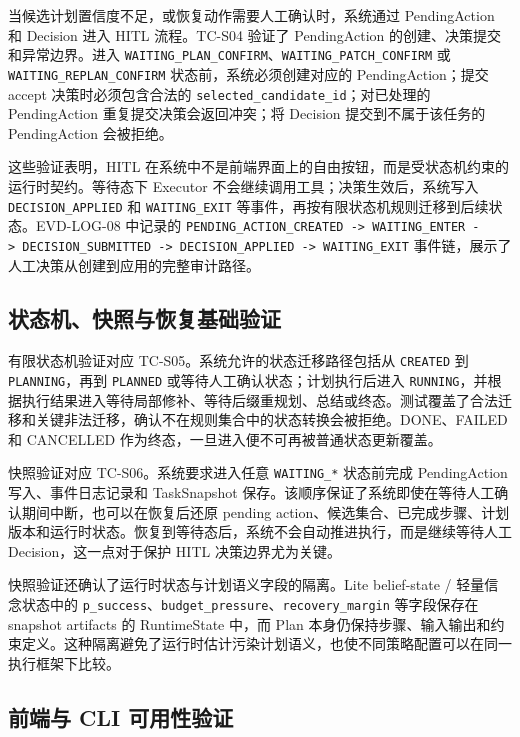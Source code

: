 当候选计划置信度不足，或恢复动作需要人工确认时，系统通过 PendingAction
和 Decision 进入 HITL 流程。TC-S04 验证了 PendingAction
的创建、决策提交和异常边界。进入
\texttt{WAITING\_PLAN\_CONFIRM}、\texttt{WAITING\_PATCH\_CONFIRM} 或
\texttt{WAITING\_REPLAN\_CONFIRM} 状态前，系统必须创建对应的
PendingAction；提交 accept 决策时必须包含合法的
\texttt{selected\_candidate\_id}；对已处理的 PendingAction
重复提交决策会返回冲突；将 Decision 提交到不属于该任务的 PendingAction
会被拒绝。

这些验证表明，HITL
在系统中不是前端界面上的自由按钮，而是受状态机约束的运行时契约。等待态下
Executor 不会继续调用工具；决策生效后，系统写入
\texttt{DECISION\_APPLIED} 和 \texttt{WAITING\_EXIT}
等事件，再按有限状态机规则迁移到后续状态。EVD-LOG-08 中记录的
\texttt{PENDING\_ACTION\_CREATED\ -\textgreater{}\ WAITING\_ENTER\ -\textgreater{}\ DECISION\_SUBMITTED\ -\textgreater{}\ DECISION\_APPLIED\ -\textgreater{}\ WAITING\_EXIT}
事件链，展示了人工决策从创建到应用的完整审计路径。

\subsection{状态机、快照与恢复基础验证}\label{ux72b6ux6001ux673aux5febux7167ux4e0eux6062ux590dux57faux7840ux9a8cux8bc1}

有限状态机验证对应 TC-S05。系统允许的状态迁移路径包括从 \texttt{CREATED}
到 \texttt{PLANNING}，再到 \texttt{PLANNED}
或等待人工确认状态；计划执行后进入
\texttt{RUNNING}，并根据执行结果进入等待局部修补、等待后缀重规划、总结或终态。测试覆盖了合法迁移和关键非法迁移，确认不在规则集合中的状态转换会被拒绝。DONE、FAILED
和 CANCELLED 作为终态，一旦进入便不可再被普通状态更新覆盖。

快照验证对应 TC-S06。系统要求进入任意 \texttt{WAITING\_*} 状态前完成
PendingAction 写入、事件日志记录和 TaskSnapshot
保存。该顺序保证了系统即使在等待人工确认期间中断，也可以在恢复后还原
pending
action、候选集合、已完成步骤、计划版本和运行时状态。恢复到等待态后，系统不会自动推进执行，而是继续等待人工
Decision，这一点对于保护 HITL 决策边界尤为关键。

快照验证还确认了运行时状态与计划语义字段的隔离。Lite belief-state /
轻量信念状态中的
\texttt{p\_success}、\texttt{budget\_pressure}、\texttt{recovery\_margin}
等字段保存在 snapshot artifacts 的 RuntimeState 中，而 Plan
本身仍保持步骤、输入输出和约束定义。这种隔离避免了运行时估计污染计划语义，也使不同策略配置可以在同一执行框架下比较。

\subsection{前端与 CLI
可用性验证}\label{ux524dux7aefux4e0e-cli-ux53efux7528ux6027ux9a8cux8bc1}

